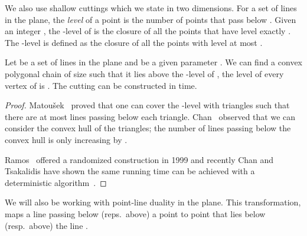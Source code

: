 We also use shallow cuttings which we state in two dimensions.
For a set of lines  in the plane, the \emph{level} of a point  is the number
of points that pass below . 
Given an integer , the -level of  is the closure of all the points that have
level exactly .
The -level is defined as the closure of all the points with level at most .
\begin{theorem}\label{thm:shallow}
	Let  be a set of  lines in the plane and  be a given parameter .
	We can find a convex polygonal chain  of size  such that it lies above
	the -level of , the level of every vertex of  is .
	The cutting can be constructed in  time. 
\end{theorem}
\begin{proof}
	Matou\v sek~\cite{Matousek.reporting.points} proved that one can cover the -level
	with  triangles such that there are at most  lines passing below
	each triangle. 
	Chan~\cite{Chan.Range.Reporting.SJC00} observed that we can consider the convex hull of the triangles; 
	the number of lines passing below the convex hull is only increasing by .

	Ramos~\cite{Ramos.SOCG99} offered a randomized  construction in 1999
	and recently Chan and Tsakalidis have shown the same running time can be
	achieved with a deterministic algorithm~\cite{chanshallow}.
\end{proof}


We will also be working with point-line duality in the plane.
This transformation, maps a line  passing below (reps.\ above) a point 
to point  that lies below (resp.\ above) the line .



